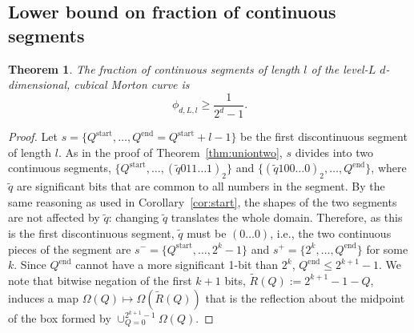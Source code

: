 \documentclass[a4paper,11pt]{article}
\newcommand{\seclab}[1]{\label{sec:#1}}
\newtheorem{thm}{Theorem}
\begin{document}
\subsection{Lower bound on fraction of continuous segments}
\seclab{prooflowerbound}



\begin{thm}
  \label{thm:lowerbound}
  The fraction of continuous segments of length $l$ of the level-$L$
  $d$-dimensional, cubical Morton curve is
\begin{equation}
    \phi_{d,L,l} \geq \frac{1}{2^d  -1}.
  \end{equation}
\end{thm}
\begin{proof}
  Let $s=\{Q^{\text{start}},\dots,Q^{\text{end}} = Q^{\text{start}}+l-1\}$ be
  the first discontinuous segment of length $l$.  As in the proof of
  Theorem~\ref{thm:uniontwo}, $s$ divides into two continuous segments,
  $\{Q^{\text{start}},\dots,(\tilde{q}011\dots1)_2\}$ and
  $\{(\tilde{q}100\dots0)_2,\dots,Q^{\text{end}}\}$, where $\tilde{q}$ are
  significant bits that are common to all numbers in the segment.  By the same
  reasoning as used in Corollary~\ref{cor:start}, the shapes of the two segments
  are not affected by $\tilde{q}$: changing $\tilde{q}$ translates the whole
  domain.  Therefore, as this is the first discontinuous segment, $\tilde{q}$
  must be $(0\dots 0)$, i.e., the two continuous pieces of the segment are
  $s^-=\{Q^{\text{start}},\dots,2^k-1\}$ and $s^+=\{2^k,\dots,Q^{\text{end}}\}$
  for some $k$.  Since $Q^{\text{end}}$ cannot have a more significant 1-bit
  than $2^k$, $Q^{\text{end}} \leq 2^{k+1} - 1$.  We note that bitwise negation
  of the first $k+1$ bits, $\tilde{R}(Q):=2^{k+1}-1-Q$, induces a map
  $\Omega(Q)\mapsto \Omega(\tilde{R}(Q))$ that is the reflection about the
  midpoint of the box formed by $\cup_{Q=0}^{2^{k+1}-1} \Omega(Q)$.


\end{proof}
\end{document}

